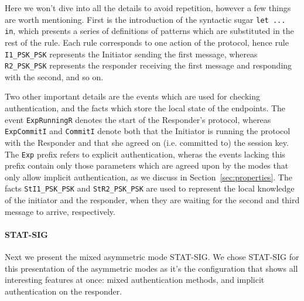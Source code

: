 Here we won't dive into all the details to avoid repetition, however a
few things are worth mentioning.  First is the introduction of the
syntactic sugar \lstinline{let ... in}, which presents a series of
definitions of patterns which are substituted in the rest of the
rule. Each rule corresponds to one action of the protocol, hence rule
\lstinline{I1_PSK_PSK} represents the Initiator sending the first
message, whereas \lstinline{R2_PSK_PSK} represents the responder
receiving the first message and responding with the second, and so on.

Two other important details are the events which are used for checking
authentication, and the facts which store the local state of the
endpoints. 
%
The event \lstinline{ExpRunningR} denotes the start of the Responder's
protocol, whereas \lstinline{ExpCommitI} and \lstinline{CommitI}
denote both that the Initiator is running the protocol with the
Responder and that she agreed on (i.e. committed to) the session key.
%
The \lstinline{Exp} prefix refers to explicit authentication, wheras
the events lacking this prefix contain only those parameters which are
agreed upon by the modes that only allow implicit authentication, as
we discuss in Section~\ref{sec:properties}.
%
The facts \lstinline{StI1_PSK_PSK} and \lstinline{StR2_PSK_PSK} are
used to represent the local knowledge of the initiator and the
responder, when they are waiting for the second and third message to
arrive, respectively.

\paragraph{STAT-SIG}
Next we present the mixed asymmetric mode STAT-SIG. We chose STAT-SIG
for this presentation of the asymmetric modes as it's the
configuration that shows all interesting features at once: mixed
authentication methods, and implicit authentication on the responder.

